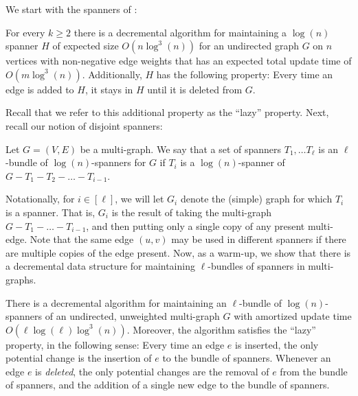 \documentclass{article}
\begin{document}
We start with the spanners of \cite{ADKKP16}:

\begin{theorem}\cite{ADKKP16}\label{thm:decrementalSpanners}
For every $k \geq 2$ there is a decremental algorithm for maintaining a $\log(n)$ spanner $H$ of expected size $O( n \log^3(n))$ for an undirected graph $G$ on $n$ vertices with non-negative edge weights that has an expected total update time of $O( m \log^3(n))$. Additionally, $H$ has the following
property: Every time an edge is added to $H$, it stays in $H$ until it is deleted from $G$. 
\end{theorem}

Recall that we refer to this additional property as the ``lazy'' property. Next, recall our notion of disjoint spanners:

\begin{definition}
    Let $G = (V, E)$ be a multi-graph. We say that a set of spanners $T_1, \dots T_{\ell}$ is an $\ell$-bundle of $\log(n)$-spanners for $G$ if $T_i$ is a $\log(n)$-spanner of $G - T_1 - T_2 - \dots - T_{i-1}$. 
\end{definition}

Notationally, for $i \in [\ell]$, we will let $G_i$ denote the (simple) graph for which $T_i$ is a spanner. That is, $G_i$ is the result of taking the multi-graph $G - T_1 - \dots - T_{i-1}$, and then putting only a single copy of any present multi-edge. Note that the same edge $(u,v)$ may be used in different spanners if there are multiple copies of the edge present. Now, as a warm-up, we show that there is a decremental data structure for maintaining $\ell$-bundles of spanners in multi-graphs. 

\begin{claim}\label{clm:dataStructureWithoutLabels}
    There is a decremental algorithm for maintaining an $\ell$-bundle of $\log(n)$-spanners of an undirected, unweighted multi-graph $G$ with amortized update time $O(\ell \log(\ell) \log^3(n) )$. Moreover, the algorithm satisfies the ``lazy'' property, in the following sense:
    Every time an edge $e$ is inserted, the only potential change is the insertion of $e$ to the bundle of spanners. Whenever an edge $e$ is \emph{deleted}, the only potential changes are the removal of $e$ from the bundle of spanners, and the addition of a single new edge to the bundle of spanners. 
\end{claim}
\end{document}
